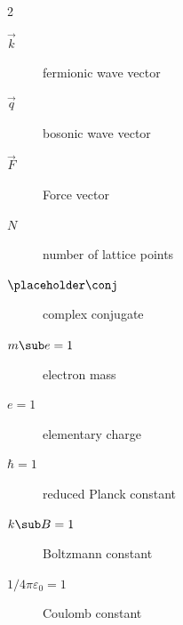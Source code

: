 \begin{multicols}{2}
\begin{description}
    \item[$\vec k$] fermionic wave vector
    \item[$\vec q$] bosonic wave vector %
    \item[$\vec F$] Force vector
    \item[$N$] number of lattice points
    \item[$\placeholder \conj$] complex conjugate
    \item[$m \sub e = 1$] electron mass
    \item[$e = 1$] elementary charge
    \item[$\hbar = 1$] reduced Planck constant
    \item[$k \sub B = 1$] Boltzmann constant
    \item[$1 / 4 \pi \varepsilon_0 = 1$] Coulomb constant
\end{description}
\end{multicols}